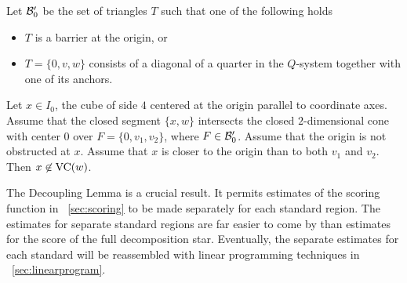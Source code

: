 Let ${\mathcal B}_0'$ be the set of triangles $T$ such that one of the
following holds
\begin{itemize}
    \item $T$ is a barrier at the origin, or
    \item $T=\{0,v,w\}$ consists of a diagonal of a quarter in the
    $Q$-system together with one of its anchors.
\end{itemize}

\begin{lemma} \label{lemma:V-cell-local}
Let $x\in I_0$, the cube of side $4$ centered at the origin
parallel to coordinate axes.  Assume that the closed segment
$\{x,w\}$ intersects the closed $2$-dimensional cone with center
$0$ over $F=\{0,v_1,v_2\}$, where $F\in{\mathcal B}'_0$. Assume that the
origin is not obstructed at $x$. Assume that $x$ is closer to the
origin than to both $v_1$ and $v_2$. Then $x\not\in{\operatorname{VC}}(w)$.
\end{lemma}

\begin{remark}  The Decoupling Lemma is a crucial result.  It
permits estimates of the scoring function in
\Chap~\ref{sec:scoring} to be made separately for each standard
region.  The estimates for separate standard regions are far
easier to come by than estimates for the score of the full
decomposition star.  Eventually, the separate estimates for each
standard will be reassembled with linear programming techniques in
\Chap~\ref{sec:linearprogram}.
\end{remark}




